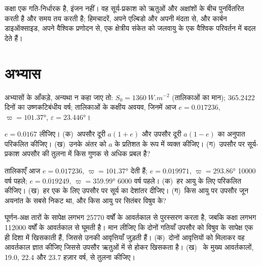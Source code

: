 कक्षा एक गति-निर्धारक है, इंजन नहीं। वह सूर्य-प्रकाश को ऋतुओं और अक्षांशों के बीच पुनर्वितरित करती है
और समय तय करती है; हिमचादरें, अपने एल्बिडो और अपनी मंदता से, और कार्बन डाइऑक्साइड, अपने
वैश्विक प्रणोदन से, एक क्षेत्रीय संकेत को जलवायु के एक वैश्विक परिवर्तन में बदल देते हैं।

\section*{अभ्यास}\label{sec:b2:orbital-forcing:exercises}

अभ्यासों के आँकड़े, अन्यथा न कहा जाए तो: $S_0 = \qty{1360}{W.m^{-2}}$ (तालिकाओं का
मान); \num{365.2422} दिनों का उष्णकटिबंधीय वर्ष; तालिकाओं के कक्षीय अवयव, जिनमें आज
$e = 0.017236$, $\varpi = \ang{101.37}$, $\varepsilon = \ang{23.446}$।

\begin{exercise}[$\star$]\label{exo:b2:orbital-forcing:1}
$e = 0.0167$ लीजिए। (क)~अपसौर दूरी $a(1 + e)$ और उपसौर
दूरी $a(1 - e)$ का अनुपात परिकलित कीजिए। (ख)~उनके अंतर को $a$ के प्रतिशत के रूप में व्यक्त कीजिए। (ग)~उपसौर पर
सूर्य-प्रकाश अपसौर की तुलना में किस गुणक से अधिक प्रबल है?
\end{exercise}

\begin{exercise}[$\star$]\label{exo:b2:orbital-forcing:2}
तालिकाएँ आज $e = 0.017236$, $\varpi = \ang{101.37}$ देती हैं; $e = 0.019971$, $\varpi =
\ang{293.86}$ \num{10000} वर्ष पहले; $e = 0.019249$, $\varpi = \ang{359.99}$ \num{6000} वर्ष पहले।
(क)~हर आयु के लिए  परिकलित कीजिए। (ख)~हर एक के लिए उपसौर पर सूर्य का
देशांतर दीजिए। (ग)~किस आयु पर उपसौर जून अयनांत के सबसे निकट था, और किस आयु पर
सितंबर विषुव के?
\end{exercise}

\begin{exercise}[$\star$]\label{exo:b2:orbital-forcing:3}
घूर्णन-अक्ष तारों के सापेक्ष लगभग \num{25770} वर्षों के आवर्तकाल से पुरस्सरण करता है, जबकि
कक्षा लगभग \num{112000} वर्षों के आवर्तकाल से घूमती है। मान लीजिए कि दोनों गतियाँ
उपसौर को विषुव के सापेक्ष एक ही दिशा में खिसकाती हैं, जिससे उनकी आवृत्तियाँ जुड़ती हैं। (क)~दोनों
आवृत्तियों को मिलाकर वह आवर्तकाल ज्ञात कीजिए जिससे उपसौर
ऋतुओं में से होकर खिसकता है। (ख)~ के मुख्य आवर्तकालों, \num{19.0},
\num{22.4} और \num{23.7} हज़ार वर्ष, से तुलना कीजिए।
\end{exercise}

